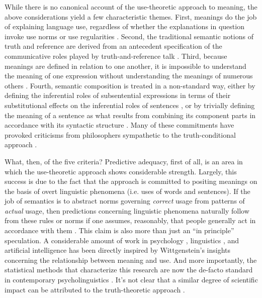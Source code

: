 While there is no canonical account of the use-theoretic approach to meaning, the above considerations yield a few characteristic themes. First, meanings do the job of explaining language use, regardless of whether the explanations in question invoke use norms \citep{Brandom:2000,Brandom:1994} or use regularities \citep{Horwich:2005,Horwich:1998}. Second, the traditional semantic notions of truth and reference are derived from an antecedent specification of the communicative roles played by truth-and-reference talk \citep{Horwich:1998,Horwich:2005,Brandom:2000,Brandom:1994}. Third, because meanings are defined in relation to one another, it is impossible to understand the meaning of one expression without understanding the meanings of numerous others \citep{Brandom:1994,Brandom:2000}. Fourth, semantic composition is treated in a non-standard way, either by defining the inferential roles of subsentential expressions in terms of their substitutional effects on the inferential roles of sentences \citep{Brandom:2000,Brandom:1994,Block:1986}, or by trivially defining the meaning of a sentence as what results from combining its component parts in accordance with its syntactic structure \citep{Horwich:2005}. Many of these commitments have provoked criticisms from philosophers sympathetic to the truth-conditional approach \citep{Stanley:2008,Speaks:2014}. 

What, then, of the five criteria? Predictive adequacy, first of all, is an area in which the use-theoretic approach shows considerable strength. Largely, this success is due to the fact that the approach is committed to positing meanings on the basis of overt linguistic phenomena (i.e. uses of words and sentences). If the job of semantics is to abstract norms governing \textit{correct} usage from patterns of \textit{actual} usage, then predictions concerning linguistic phenomena naturally follow from these rules or norms if one assumes, reasonably, that people generally act in accordance with them \cite[see][for disscussion of this ``rationality assumption'']{Dennett:1987,Brandom:1994}. This claim is also more than just an ``in principle'' speculation. A considerable amount of work in psychology \citep[e.g.][]{FrankGoodman:2012}, linguistics \citep[e.g.][]{Tomasello:2005,Manning:1999}, and artificial intelligence \citep[e.g.][]{TurneyPantel:2010} has been directly inspired by Wittgenstein's insights concerning the relationship between meaning and use. And more importantly, the statistical methods that characterize this research are now the de-facto standard in contemporary psycholinguistics \citep{Seidenberg:1997,Christiansen:2015}. It's not clear that a similar degree of scientific impact can be attributed to the truth-theoretic approach \citep[cf.][]{Soames:2010}.

